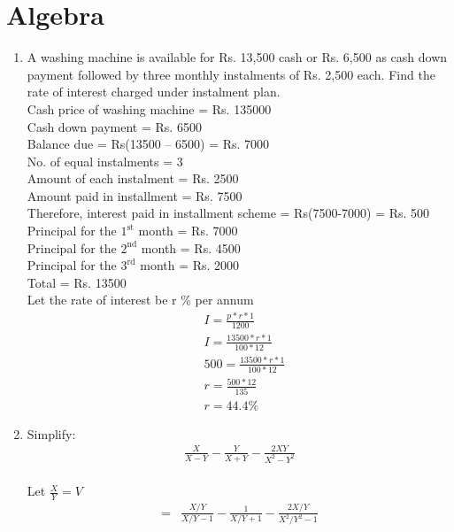 \documentclass[journal,12pt,twocolumn]{IEEEtran}
\renewcommand\thesection{\arabic{section}}
\begin{document}
\section{Algebra}
\renewcommand{\theequation}{\theenumi}
\begin{enumerate}[label=\thesection.\arabic*.,ref=\thesection.\theenumi]
\item A washing machine is available for Rs. 13,500
cash or Rs. 6,500 as cash down payment
followed by three monthly instalments of Rs.
2,500 each. Find the rate of interest charged
under instalment plan.\\
\solution
Cash price of washing machine = Rs. 135000\\
Cash down payment = Rs. 6500\\
Balance due = Rs(13500 – 6500) = Rs. 7000\\
No. of equal instalments = 3\\
Amount of each instalment = Rs. 2500\\
Amount paid in installment = Rs. 7500\\
Therefore, interest paid in installment scheme = Rs(7500-7000) = Rs. 500\\
Principal for the $1^{\text{st}}$ month = Rs. 7000\\
Principal for the $2^{\text{nd}}$ month = Rs. 4500\\
Principal for the $3^{\text{rd}}$ month = Rs. 2000\\
Total = Rs. 13500\\
Let the rate of interest be r \% per annum\\
\begin{align}
&I = \displaystyle\frac{p*r*1}{1200}\\
&I = \displaystyle\frac{13500*r*1} { 100*12}\\
&500 =\displaystyle\frac{13500*r*1 }{ 100*12}\\
&r = \displaystyle\frac{500*12}{ 135}\\
&r = 44.4 \%
\end{align}
\item Simplify:
\begin{align}
\displaystyle\frac{X}{X-Y}-\displaystyle\frac{Y}{X+Y}-\displaystyle\frac{2XY}{X^2-Y^2} \nonumber \label{eq:1}
\end{align}
\solution \\
Let $\displaystyle\frac{X}{Y} = V$
 \begin{align}
=&\displaystyle\frac{X/Y}{X/Y-1}-\displaystyle\frac{1}{X/Y+1}-\displaystyle\frac{2X/Y}{X^2/Y^2-1}\\

\end{align}
\end{enumerate}
\end{document}
